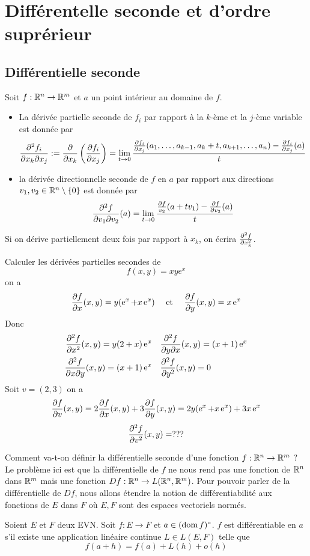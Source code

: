 \chapter{Différentelle seconde et d'ordre suprérieur}
\section{Différentielle seconde}
\begin{definition}
    Soit $f:\mathbb{R}^n\to \mathbb{R}^m$ et $a$ un point intérieur au domaine de $f$.
    \begin{itemize}
        \item La dérivée partielle seconde de $f_i$ par rapport à la $k$-ème et la $j$-ème variable est donnée par $$
        \frac{\partial ^2f_i}{\partial x_k\partial x_j} := \frac{\partial }{\partial x_k}\left(\frac{\partial f_i}{\partial x_j}\right) = \lim_{t\to 0}\frac{\frac{\partial f_i}{\partial x_j}(a_1,\dotsc,a_{k-1},a_k+t,a_{k+1},\dotsc, a_n)-\frac{\partial f_i}{\partial x_j}(a)}{t}$$ 
        \item la dérivée directionnelle seconde de $f$ en $a$ par rapport aux directions $v_1,v_2\in \mathbb{R}^n\setminus\{0\}$ est donnée par
        \begin{equation*}
            \frac{\partial^2f}{\partial v_1 \partial v_2}(a)=\lim_{t\to 0}\frac{\frac{\partial f}{v_2}(a+tv_1)-\frac{\partial f}{\partial v_2}(a)}{t}
        \end{equation*}
    \end{itemize}
\end{definition}
\begin{notation}
    Si on dérive partiellement deux fois par rapport à $x_k$, on écrira $\frac{\partial ^2f}{\partial x^2_k}$.
\end{notation}
\begin{exemple}
    Calculer les dérivées partielles secondes de
    \begin{equation*}
        f(x,y)=xye^x
    \end{equation*}
    on a $$\frac{\partial f}{\partial x}(x,y)=y(\operatorname{e}^x+x\operatorname{e}^x)\quad \text{ et }\quad \frac{\partial f}{\partial y}(x,y)=x\operatorname{e}^x$$ Donc
    \begin{align*}
        \frac{\partial ^2f}{\partial x^2}(x,y) =  y(2+x) \operatorname{e}^x \quad& \frac{\partial ^2f}{\partial y\partial x}(x,y) = (x+1)\operatorname{e}^x\\
        \frac{\partial ^2f}{\partial x\partial y}(x,y) = (x+1)\operatorname{e}^x\quad & \frac{\partial ^2f}{\partial y^2}(x,y) = 0
    \end{align*}
    Soit $v=(2,3)$ on a $$\frac{\partial f}{\partial v}(x,y) = 2\frac{\partial f}{\partial x}(x,y)+3\frac{\partial f}{\partial y}(x,y) = 2y(\operatorname{e}^x+x\operatorname{e}^x) + 3x\operatorname{e}^x$$
    $$\frac{\partial ^2f}{\partial v^2}(x,y) = ???$$
\end{exemple}
Comment va-t-on définir la différentielle seconde d'une fonction $f:\mathbb{R}^n\to\mathbb{R}^m$ ? Le problème ici est que la différentielle de $f$ ne nous rend pas une fonction de $\mathbb{R}^n$ dans $\mathbb{R}^m$ mais une fonction $Df : \mathbb{R}^n\to L(\mathbb{R}^n,\mathbb{R}^m)$. Pour pouvoir parler de la différentielle de $Df$, nous allons étendre la notion de différentiabilité aux fonctions de $E$ dans $F$ où $E,F$ sont des espaces vectoriels normés.
\begin{definition}
    Soient $E$ et $F$ deux EVN. Soit $f:E\to F$ et $a\in(\operatorname{dom} f)^\circ$. $f$ est différentiable en $a$ s'il existe une application linéaire continue $L\in L(E,F)$ telle que $$f(a+h) = f(a) + L(h)+ o (h)$$
\end{definition}

